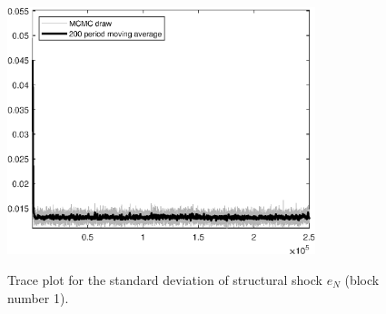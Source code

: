 \begin{figure}[H]
\centering
  \includegraphics[width=0.8\textwidth]{BRS_growth_ext_fd_v1/graphs/TracePlot_SE_e_N_blck_1}\\
    \caption{Trace plot for the standard deviation of structural shock ${e_N}$ (block number 1).}
\end{figure}

